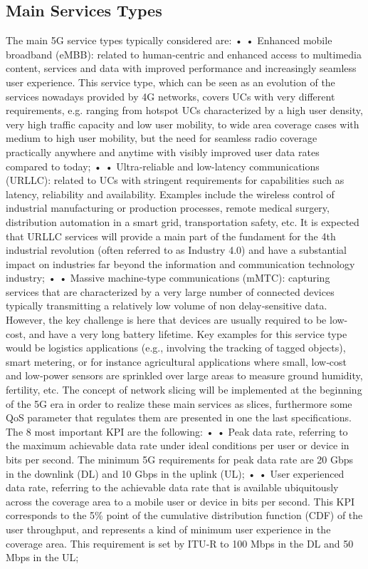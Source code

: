 \documentclass{report}
\begin{document}
\subsection{Main Services Types}
The main 5G service types typically considered are:
• • Enhanced mobile broadband (eMBB): related to human‐centric and enhanced access to multimedia content, services and data with improved performance and increasingly seamless user experience. This service type, which can be seen as an evolution of the services nowadays provided by
4G networks, covers UCs with very different requirements, e.g. ranging from hotspot UCs characterized by a high user density, very high traffic capacity and low user mobility, to wide area coverage cases with medium to high user mobility, but the need for seamless radio coverage practically
anywhere and anytime with visibly improved user data rates compared to today;
• • Ultra‐reliable and low-latency communications (URLLC): related to UCs with stringent requirements for capabilities such as latency, reliability and availability. Examples include the wireless
control of industrial manufacturing or production processes, remote medical surgery, distribution automation in a smart grid, transportation safety, etc. It is expected that URLLC services will provide a main part of the fundament for the 4th industrial revolution (often referred to as
Industry 4.0) and have a substantial impact on industries far beyond the information and communication technology industry;
• • Massive machine‐type communications (mMTC): capturing services that are characterized by
a very large number of connected devices typically transmitting a relatively low volume of non delay‐sensitive data. However, the key challenge is here that devices are usually required to be
low-cost, and have a very long battery lifetime. Key examples for this service type would be logistics applications (e.g., involving the tracking of tagged objects), smart metering, or for instance
agricultural applications where small, low‐cost and low‐power sensors are sprinkled over large
areas to measure ground humidity, fertility, etc.
The concept of network slicing will be implemented at the beginning of the 5G era in order to realize these main services as slices, furthermore some QoS parameter that regulates them are presented in one the last specifications. The 8 most important KPI are the following:
• •
 Peak data rate, referring to the maximum achievable data rate under ideal conditions per user or
device in bits per second. The minimum 5G requirements for peak data rate are 20 Gbps in the
downlink (DL) and 10 Gbps in the uplink (UL);
• •
 User experienced data rate, referring to the achievable data rate that is available ubiquitously
across the coverage area to a mobile user or device in bits per second. This KPI corresponds to the
5\% point of the cumulative distribution function (CDF) of the user throughput, and represents
a kind of minimum user experience in the coverage area. This requirement is set by ITU‐R to
100 Mbps in the DL and 50 Mbps in the UL;
\end{document}
